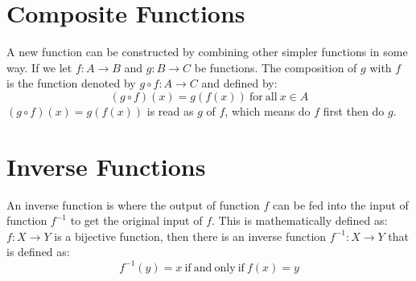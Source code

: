 \section{Composite Functions}
A new function can be constructed by combining other simpler functions in some way. If we let $f: A \rightarrow B$ and $g: B \rightarrow C$ be functions. The composition of $g$ with $f$ is the function denoted by $g \circ f: A \rightarrow C$ and defined by:
\[(g\circ f) (x) = g(f(x)) \mathrm{\ for\ all\ } x\in A\]
$(g\circ f) (x) = g(f(x))$ is read as $g$ of $f$, which means do $f$ first then do $g$. 

\section{Inverse Functions}
An inverse function is where the output of function $f$ can be fed into the input of function $f^{-1}$ to get the original input of $f$. This is mathematically defined as: $f: X \rightarrow Y$ is a bijective function, then there is an inverse function $f^{-1}: X \rightarrow Y$ that is defined as:
\[f^{-1} (y) = x \mathrm{\ if\ and\ only\ if\ } f(x) = y \]
